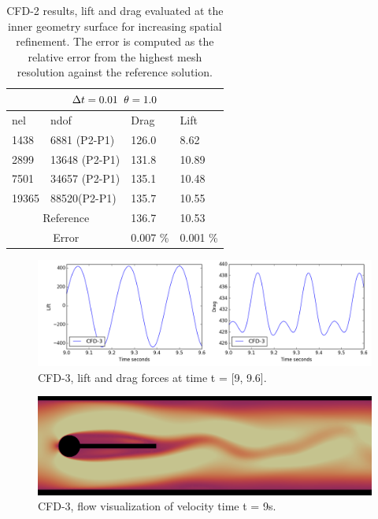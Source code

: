 \begin{table}[h!]
\centering
\label{CFD-2 Results}
\begin{tabular}{ |p{1cm}||p{2.7cm}|p{3.3cm}|p{3.3cm}|}
 \hline
  \multicolumn{4}{|c|}{$\Delta t = 0.01 \hspace{2mm} \theta = 1.0$} \\
   \hline
nel & ndof & Drag  & Lift \\
\hline
 1438    & 6881 (P2-P1)  & 126.0 &  8.62 \\
 2899    & 13648  (P2-P1)& 131.8 & 10.89  \\
 7501    & 34657 (P2-P1) & 135.1 & 10.48  \\
 19365   & 88520(P2-P1)  & 135.7 & 10.55  \\
 \hline
  \multicolumn{2}{|c|}{Reference}  & 136.7   & 10.53\\
   \hline
    \multicolumn{2}{|c|}{Error}  & 0.007 \%   & 0.001 \%\\
   \hline
\end{tabular}
\caption{CFD-2 results, lift and drag evaluated at the inner geometry surface for increasing spatial refinement. The error is computed as the relative error from the highest mesh resolution against the reference solution.}
\label{table:cfd2}
\end{table}
\begin{figure}[h!]
  \centering
    \includegraphics[scale=0.5]{./Fig/cfd3_liftdrag.png}
      \caption{CFD-3, lift and drag forces at time t = [9, 9.6].}
\end{figure}
\begin{figure}[h!]
  \centering
    \includegraphics[scale=0.2]{./Fig/cfd3.png}
      \caption{CFD-3, flow visualization of velocity time t = 9s.}
\end{figure}
